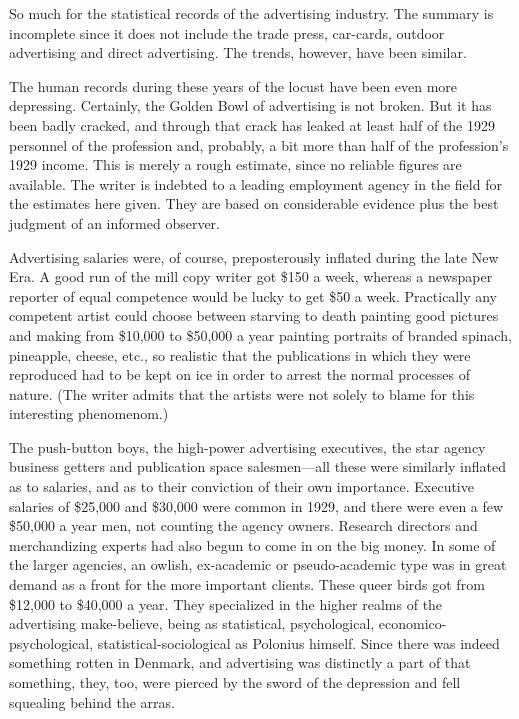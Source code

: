 \documentclass[openany,nobib]{tufte-book}
\begin{document}
So much for the statistical records of the advertising industry. The
summary is incomplete since it does not include the trade press,
car-cards, outdoor advertising and direct advertising. The trends,
however, have been similar.

The human records during these years of the locust have been even more
depressing. Certainly, the Golden Bowl of advertising is not broken. But
it has been badly cracked, and through that crack has leaked at least
half of the 1929 personnel of the profession and, probably, a bit more
than half of the profession's 1929 income. This is merely a rough
estimate, since no reliable figures are available. The writer is
indebted to a leading employment agency in the field for the estimates
here given. They are based on considerable evidence plus the best
judgment of an informed observer.

Advertising salaries were, of course, preposterously inflated during the
late New Era. A good run of the mill copy writer got \$150 a week,
whereas a newspaper reporter of equal competence would be lucky to get
\$50 a week. Practically any competent artist could choose between
starving to death painting good pictures and making from \$10,000 to
\$50,000 a year painting portraits of branded spinach, pineapple,
cheese, etc., so realistic that the publications in which they were
reproduced had to be kept on ice in order to arrest the normal processes
of nature. (The writer admits that the artists were not solely to blame
for this interesting phenomenom.)

The push-button boys, the high-power advertising executives, the star
agency business getters and publication space salesmen---all these were
similarly inflated as to salaries, and as to their conviction of their
own importance. Executive salaries of \$25,000 and \$30,000 were common
in 1929, and there were even a few \$50,000 a year men, not counting the
agency owners. Research directors and merchandizing experts had also
begun to come in on the big money. In some of the larger agencies, an
owlish, ex-academic or pseudo-academic type was in great demand as a
front for the more important clients. These queer birds got from
\$12,000 to \$40,000 a year. They specialized in the higher realms of
the advertising make-believe, being as statistical, psychological,
economico-psychological, statistical-sociological as Polonius himself.
Since there was indeed something rotten in Denmark, and advertising was
distinctly a part of that something, they, too, were pierced by the
sword of the depression and fell squealing behind the arras.
\end{document}
